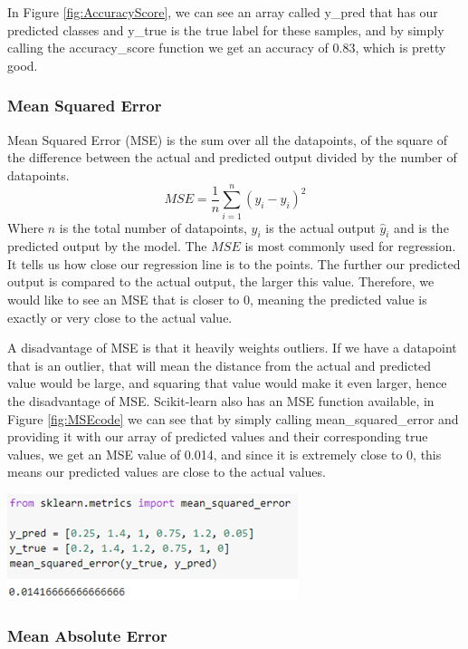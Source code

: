 \documentclass[a4paper,12pt]{report}
\begin{document}
In Figure \ref{fig:AccuracyScore}, we can see an array called y\_pred that has our predicted classes and y\_true is the true label for these samples, and by simply calling the accuracy\_score function we get an accuracy of 0.83, which is pretty good.

\subsubsection{Mean Squared Error}

Mean Squared Error (MSE) is the sum over all the datapoints, of the square of the difference between the actual and predicted output divided by the number of datapoints.
$$MSE=\frac{1}{n}\sum_{i=1}^n(y_i-\hat{y}_i)^2$$
Where $n$ is the total number of datapoints, $y_i$ is the actual output $\hat{y}_i$ and  is the predicted output by the model. The $MSE$ is most commonly used for regression. It tells us how close our regression line is to the points. The further our predicted output is compared to the actual output, the larger this value. Therefore, we would like to see an MSE that is closer to 0, meaning the predicted value is exactly or very close to the actual value.

A disadvantage of MSE is that it heavily weights outliers. If we have a datapoint that is an outlier, that will mean the distance from the actual and predicted value would be large, and squaring that value would make it even larger, hence the disadvantage of MSE. Scikit-learn also has an MSE function available, in Figure \ref{fig:MSEcode} we can see that by simply calling mean\_squared\_error and providing it with our array of predicted values and their corresponding true values, we get an MSE value of 0.014, and since it is extremely close to 0, this means our predicted values are close to the actual values.

\begin{center}
    \captionsetup{type=figure}
    \includegraphics[width=.7\linewidth]{media/MSEcode.png}
    \label{fig:MSEcode}
\end{center}

\subsubsection{Mean Absolute Error}
\end{document}
